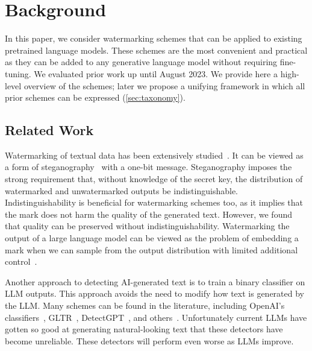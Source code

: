 \section{Background}
\label{sec:background}

In this paper, we consider watermarking schemes that can be applied to existing pretrained language models.
%
These schemes are the most convenient and practical as they can be added to any generative language model
without requiring fine-tuning.
%
We evaluated prior work up until August 2023.
%
We provide here a high-level overview of the schemes;
later we propose a unifying framework in which all prior schemes can be expressed (\cref{sec:taxonomy}).


\subsection{Related Work}
\label{ssec:relwork}

Watermarking of textual data has been extensively studied~\citep{kamaruddin18,rizzo17,ahvanooey19}.
It can be viewed as a form of steganography~\citep{cox_information_2005,majeed_review_2021} with a one-bit message.
Steganography imposes the strong requirement that, without knowledge of the secret key, the distribution of watermarked 
and unwatermarked outputs be indistinguishable.
Indistinguishability is beneficial for watermarking schemes too,
as it implies that the mark does not harm the quality of the generated text. However, we found that quality can 
be preserved without indistinguishability.
Watermarking the output of a large language model can be viewed as the problem of embedding a mark when we can 
sample from the output distribution with limited additional 
control~\citep{hopper2008stego,ziegler_neural_2019a,xiang_novel_2020,kang_generative_2020,cao_generative_2022}. 

Another approach to detecting AI-generated text is to train a binary classifier on LLM outputs.
This approach avoids the need to modify how text is generated by the LLM.
Many schemes can be found in the literature,
including OpenAI's classifiers~\citep{openai_gpt2outputdataset_2021,openai_new_2023}, GLTR~\citep{gehrmann_gltr_2019a}, DetectGPT~\citep{mitchell_detectgpt_2023},
and others~\citep{bakhtin_real_2019,zellers_defending_2019a,ippolito_automatic_2020,uchendu_authorship_2020,fagni_tweepfake_2021}.
Unfortunately current LLMs have gotten so good at generating natural-looking text that these detectors 
have become unreliable. These detectors will perform even worse as LLMs improve.

